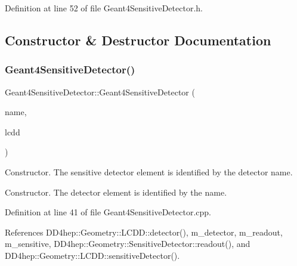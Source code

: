 Definition at line 52 of file Geant4\+Sensitive\+Detector.\+h.



\subsection{Constructor \& Destructor Documentation}
\hypertarget{class_d_d4hep_1_1_simulation_1_1_geant4_sensitive_detector_a5f0a68385e61bdf9434712079302319e}{}\label{class_d_d4hep_1_1_simulation_1_1_geant4_sensitive_detector_a5f0a68385e61bdf9434712079302319e} 
\subsubsection{\texorpdfstring{Geant4\+Sensitive\+Detector()}{Geant4SensitiveDetector()}}
{\footnotesize\ttfamily Geant4\+Sensitive\+Detector\+::\+Geant4\+Sensitive\+Detector (\begin{DoxyParamCaption}\item[{const std\+::string \&}]{name,  }\item[{\hyperlink{class_d_d4hep_1_1_geometry_1_1_l_c_d_d}{L\+C\+DD} \&}]{lcdd }\end{DoxyParamCaption})}



Constructor. The sensitive detector element is identified by the detector name. 

Constructor. The detector element is identified by the name. 

Definition at line 41 of file Geant4\+Sensitive\+Detector.\+cpp.



References D\+D4hep\+::\+Geometry\+::\+L\+C\+D\+D\+::detector(), m\+\_\+detector, m\+\_\+readout, m\+\_\+sensitive, D\+D4hep\+::\+Geometry\+::\+Sensitive\+Detector\+::readout(), and D\+D4hep\+::\+Geometry\+::\+L\+C\+D\+D\+::sensitive\+Detector().

\hypertarget{class_d_d4hep_1_1_simulation_1_1_geant4_sensitive_detector_a15bd6477c7c266c3478c59ac34b2fe31}{}\label{class_d_d4hep_1_1_simulation_1_1_geant4_sensitive_detector_a15bd6477c7c266c3478c59ac34b2fe31} 
